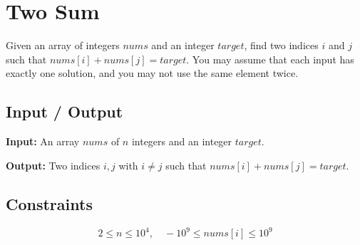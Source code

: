 \section{Two Sum}

Given an array of integers $nums$ and an integer $target$, find two indices $i$ and $j$ such that
$nums[i] + nums[j] = target$. You may assume that each input has exactly one solution, and you
may not use the same element twice.

\subsection{Input / Output}

\textbf{Input:} An array $nums$ of $n$ integers and an integer $target$.

\textbf{Output:} Two indices $i, j$ with $i \neq j$ such that $nums[i] + nums[j] = target$.

\subsection{Constraints}

$$2 \leq n \leq 10^4, \quad -10^9 \leq nums[i] \leq 10^9$$

\begin{diagram}[id="input-array", label="Input array visualization"]
\end{diagram}

